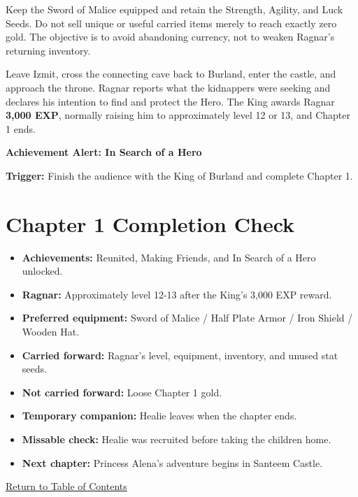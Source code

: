 \documentclass[
  american,
  10pt,
  letterpaper,
  oneside,
  open=any]{scrreprt}
\providecommand{\tightlist}{%
  \setlength{\itemsep}{0pt}\setlength{\parskip}{0pt}}
\begin{document}
Keep the Sword of Malice equipped and retain the Strength, Agility, and
Luck Seeds. Do not sell unique or useful carried items merely to reach
exactly zero gold. The objective is to avoid abandoning currency, not to
weaken Ragnar's returning inventory.

Leave Izmit, cross the connecting cave back to Burland, enter the
castle, and approach the throne. Ragnar reports what the kidnappers were
seeking and declares his intention to find and protect the Hero. The
King awards Ragnar \textbf{3,000 EXP}, normally raising him to
approximately level 12 or 13, and Chapter 1 ends.

\begin{achievementalert}

\textbf{Achievement Alert: In Search of a Hero}

\textbf{Trigger:} Finish the audience with the King of Burland and
complete Chapter 1.

\end{achievementalert}

\section{Chapter 1 Completion Check}\label{chapter-1-completion-check}

\begin{itemize}
\tightlist
\item
  \textbf{Achievements:} Reunited, Making Friends, and In Search of a
  Hero unlocked.
\item
  \textbf{Ragnar:} Approximately level 12-13 after the King's 3,000 EXP
  reward.
\item
  \textbf{Preferred equipment:} Sword of Malice / Half Plate Armor /
  Iron Shield / Wooden Hat.
\item
  \textbf{Carried forward:} Ragnar's level, equipment, inventory, and
  unused stat seeds.
\item
  \textbf{Not carried forward:} Loose Chapter 1 gold.
\item
  \textbf{Temporary companion:} Healie leaves when the chapter ends.
\item
  \textbf{Missable check:} Healie was recruited before taking the
  children home.
\item
  \textbf{Next chapter:} Princess Alena's adventure begins in Santeem
  Castle.
\end{itemize}

\hyperref[table-of-contents]{Return to Table of Contents}
\end{document}
